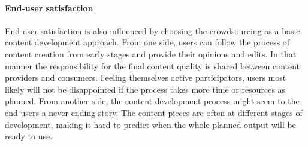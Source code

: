 \documentclass[ngerman,UKenglish,table]{scrbook}
\begin{document}
%
%

\paragraph{End-user satisfaction}

End-user satisfaction is also influenced by choosing the crowdsourcing as a basic content development approach.
From one side, users can follow the process of content creation from early stages and provide their opinions and edits.
In that manner the responsibility for the final content quality is shared between content providers and consumers.
Feeling themselves active participators, users most likely will not be disappointed if the process takes more time or resources as planned.
From another side, the content development process might seem to the end users a never-ending story.
The content pieces are often at different stages of development, making it hard to predict when the whole planned output will be ready to use.

%
%
%
%
%
\end{document}
